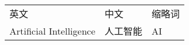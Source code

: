 


\begin{terminology}
\begin{longtable}{p{7cm}p{5cm}p{2cm}<{\centering}}  %
英文 & 中文 & 缩略词 \\
Artificial Intelligence & 人工智能     & AI \\
\end{longtable}
\end{terminology} 
